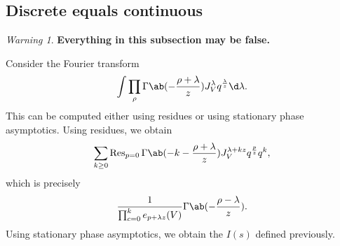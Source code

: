 \documentclass[leqno, openany]{memoir}
\theoremstyle{definition}
\theoremstyle{remark}
\newtheorem{warn}[thm]{Warning}
\theoremstyle{plain}
\theoremstyle{definition}
\theoremstyle{remark}
\newcommand{\on}[1]{\operatorname{#1}}
\begin{document}
\subsection{Discrete equals continuous}%
\label{sub:Discrete equals continuous}

\begin{warn}
    \textbf{Everything in this subsection may be false.}
\end{warn}

Consider the Fourier transform
\[ \int \prod_{\rho} \Gamma\ab(-\frac{\rho + \lambda}{z}) J_V^\lambda q^{\frac{\lambda}{z}} \d \lambda. \]
This can be computed either using residues or using stationary phase asymptotics. Using residues, we obtain
\begin{align*}
    \sum_{k \geq 0} \on{Res}_{p=0} \Gamma\ab(-k-\frac{\rho + \lambda}{z}) J_V^{\lambda + kz} q^{\frac{p}{z}} q^k,
\end{align*}
which is precisely
\[ \frac{1}{\prod_{c=0}^k e_{p+\lambda z}(V)} \Gamma\ab(-\frac{\rho-\lambda}{z}). \]
Using stationary phase asymptotics, we obtain the $I(s)$ defined previously.
\end{document}
